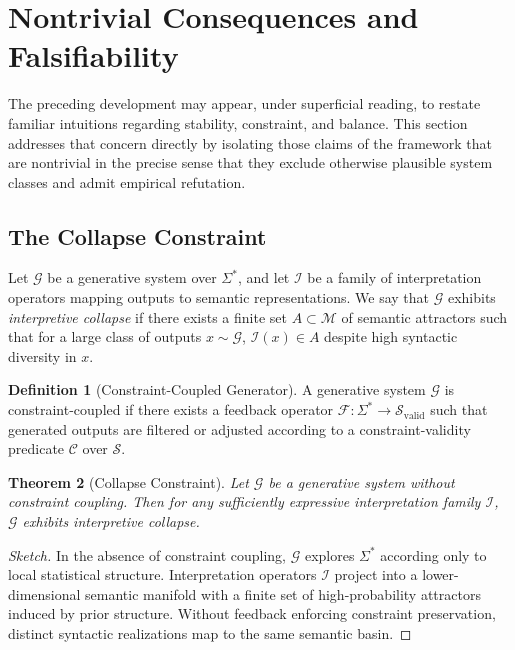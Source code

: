 \documentclass[12pt, a4paper]{article}
\theoremstyle{plain}
\newtheorem{theorem}{Theorem}[section]
\theoremstyle{definition}
\newtheorem{definition}[theorem]{Definition}
\theoremstyle{remark}
\begin{document}
\section{Nontrivial Consequences and Falsifiability}

The preceding development may appear, under superficial reading, to restate familiar intuitions regarding stability, constraint, and balance. This section addresses that concern directly by isolating those claims of the framework that are nontrivial in the precise sense that they exclude otherwise plausible system classes and admit empirical refutation.

\subsection{The Collapse Constraint}

Let $\mathcal{G}$ be a generative system over $\Sigma^*$, and let $\mathcal{I}$ be a family of interpretation operators mapping outputs to semantic representations. We say that $\mathcal{G}$ exhibits \emph{interpretive collapse} if there exists a finite set $A \subset \mathcal{M}$ of semantic attractors such that for a large class of outputs $x \sim \mathcal{G}$, $\mathcal{I}(x) \in A$ despite high syntactic diversity in $x$.

\begin{definition}[Constraint-Coupled Generator]
A generative system $\mathcal{G}$ is constraint-coupled if there exists a feedback operator $\mathcal{F} : \Sigma^* \to \mathcal{S}_{\mathrm{valid}}$ such that generated outputs are filtered or adjusted according to a constraint-validity predicate $\mathcal{C}$ over $\mathcal{S}$.
\end{definition}

\begin{theorem}[Collapse Constraint]
Let $\mathcal{G}$ be a generative system without constraint coupling. Then for any sufficiently expressive interpretation family $\mathcal{I}$, $\mathcal{G}$ exhibits interpretive collapse.
\end{theorem}

\begin{proof}[Sketch]
In the absence of constraint coupling, $\mathcal{G}$ explores $\Sigma^*$ according only to local statistical structure. Interpretation operators $\mathcal{I}$ project into a lower-dimensional semantic manifold with a finite set of high-probability attractors induced by prior structure. Without feedback enforcing constraint preservation, distinct syntactic realizations map to the same semantic basin.
\end{proof}
\end{document}
